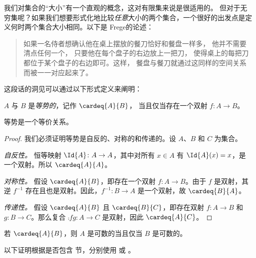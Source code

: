 \documentclass[../../../include/open-logic-section]{subfiles}
\begin{document}


我们对集合的“大小”有一个直观的概念，这对有限集来说是很适用的。
但对于无穷集呢？如果我们想要形式化地比较\emph{任意}大小的两个集合，一个很好的出发点是定义何时两个集合大小相同。以下是 Frege的论述：

\begin{quote}
  如果一名侍者想确认他在桌上摆放的餐刀恰好和餐盘一样多，
  他并不需要清点任何一个，
  只要他在每个盘子的右边放上一把刀，
  使得桌上的每把刀都位于某个盘子的右边即可。这样，
  餐盘与餐刀就通过这同样的空间关系而被一一对应起来了。
  \citep[\S70]{Frege1884}
\end{quote}

这段话的洞见可以通过以下形式定义来阐明：

\begin{defn}
  $A$ 与 $B$ 是\emph{等势的}，记作 $\cardeq{A}{B}$，
  当且仅当存在一个双射 $f \colon A \to B$。
\end{defn}

\begin{prop}
等势是一个等价关系。
\end{prop}

\begin{proof}
我们必须证明等势是自反的、对称的和传递的。设 $A$、$B$ 和 $C$ 为集合。

\emph{自反性。} 恒等映射 $\Id{A} \colon A \to A$，其中对所有 $x \in A$ 有 $\Id{A} (x) = x$，是一个双射。所以 $\cardeq{A}{A}$。

\emph{对称性。} 假设 $\cardeq{A}{B}$，即存在一个双射 $f\colon A \to B$。由于 $f$ 是双射，其逆 $f^{-1}$ 存在且也是双射。因此，$f^{-1}\colon B \to A$ 是一个双射，故 $\cardeq{B}{A}$。

\emph{传递性。} 假设 $\cardeq{A}{B}$ 且 $\cardeq{B}{C}$，即存在双射 $f\colon A \to B$ 和 $g\colon B \to C$。那么复合 $\comp{f}{g}\colon A \to C$ 是双射，因此 $\cardeq{A}{C}$。
\end{proof}

\begin{prop}
若 $\cardeq{A}{B}$，则 $A$ 是可数的当且仅当 $B$ 是可数的。
\end{prop}

\begin{editorial}
以下证明根据是否包含  节，分别使用  或 。
\end{editorial}
\end{document}
